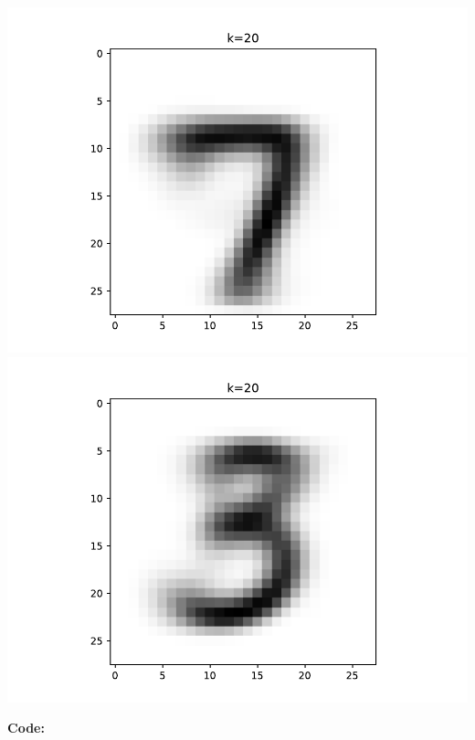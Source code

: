 \documentclass{article}
\newcommand{\1}{\mathbf{1}}
\begin{document}
\begin{enumerate}
     \includegraphics[width=2 in]{Figures/means++20_18.pdf}  
    \includegraphics[width=2 in]{Figures/means++20_19.pdf} \\
\end{enumerate}
\textbf{Code:}
\end{document}
